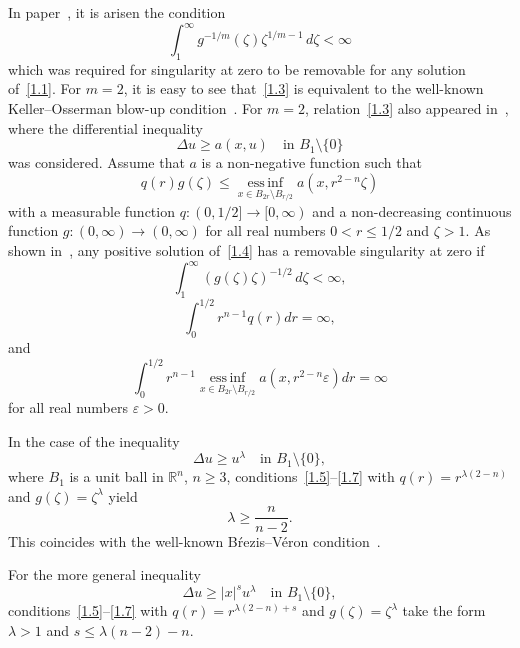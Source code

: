 \documentclass[11pt]{amsart}
\theoremstyle{definition}
\numberwithin{equation}{section}
\begin{document}
In paper~\cite{KSFCAA}, it is arisen the condition
\begin{equation}
	\int_1^\infty
	g^{- 1 / m} (\zeta)
	\zeta^{1 / m - 1}
	\,
	d\zeta
	<
	\infty
	\label{1.3}
\end{equation}
which was required for singularity at zero to be removable for any solution of~\eqref{1.1}.
For $m = 2$, it is easy to see that~\eqref{1.3} is equivalent to the well-known Keller--Osserman blow-up condition~\cite{Keller, Osserman, KSNonlinearity}.
For $m = 2$, relation~\eqref{1.3} also appeared in~\cite{meCMFI}, where the differential inequality
\begin{equation}
	\Delta u
	\ge
	a (x, u)
	\quad
	\mbox{in } B_1 \setminus \{ 0 \}
	\label{1.4}
\end{equation}
was considered. 
Assume that $a$ is a non-negative function such that
$$
	q(r) g(\zeta) 
	\le 
	\operatorname*{ess\,inf}_{
		x \in B_{2 r} \setminus B_{r / 2}
	}
	a (x, r^{2 - n} \zeta)
$$
with a measurable function $q : (0, 1 / 2] \to [0, \infty)$ and a non-decreasing continuous function $g : (0, \infty) \to (0, \infty)$ for all real numbers $0 < r \le 1 / 2$ and $\zeta > 1$.
As shown in~\cite[Theorems~6.1.1 and~6.1.5]{meCMFI}, any positive solution of~\eqref{1.4} has a removable singularity at zero if
\begin{equation}
	\int_1^\infty
	(g (\zeta) \zeta)^{- 1 / 2}
	\,
	d\zeta
	<
	\infty,
	\label{1.5}
\end{equation}
\begin{equation}
	\int_0^{1/2}
	r^{n - 1}
	q (r)
	dr
	=
	\infty,
	\label{1.6}
\end{equation}
and
\begin{equation}
	\int_0^{1/2}
	r^{n - 1}
	\operatorname*{ess\,inf}_{
		x \in B_{2 r} \setminus B_{r / 2}
	}
	a (x, r^{2 - n} \varepsilon)
	dr
	=
	\infty
	\label{1.7}
\end{equation}
for all real numbers $\varepsilon > 0$.

In the case of the inequality
$$
	\Delta u \ge u^\lambda
	\quad
	\mbox{in } B_1 \setminus \{ 0 \},
$$
where $B_1$ is a unit ball in $\mathbb R^n$, $n \ge 3$,
conditions~\eqref{1.5}--\eqref{1.7} with $q (r) = r^{\lambda (2 - n)}$ and $g (\zeta) = \zeta^\lambda$ yield
$$
	\lambda \ge \frac{n}{n - 2}.
$$
This coincides with the well-known B\'rezis--V\'eron condition~\cite{BV}.

For the more general inequality
\begin{equation}
	\Delta u \ge |x|^s u^\lambda
	\quad
	\mbox{in } B_1 \setminus \{ 0 \},
	\label{1.8}
\end{equation}
conditions~\eqref{1.5}--\eqref{1.7} with $q (r) = r^{\lambda (2 - n) + s}$ and $g (\zeta) = \zeta^\lambda$ take the form $\lambda > 1$ and $s \le \lambda (n - 2) - n$.
\end{document}

